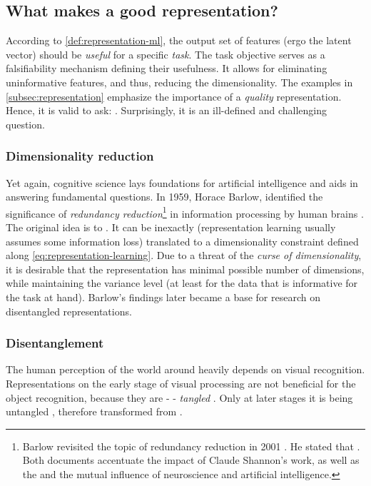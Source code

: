 \subsection{What makes a good representation?}
According to \autoref{def:representation-ml}, the output set of features (ergo the latent vector) should be \textit{useful} for a specific \textit{task}. The task objective serves as a falsifiability mechanism defining their usefulness. It allows for eliminating uninformative features, and thus, reducing the dimensionality. The examples in \autoref{subsec:representation} emphasize the importance of a \textit{quality} representation. Hence, it is valid to ask: . Surprisingly, it is an ill-defined and challenging question.


\subsubsection{Dimensionality reduction}
Yet again, cognitive science lays foundations for artificial intelligence and aids in answering fundamental questions. In 1959, Horace Barlow, identified the significance of \textit{redundancy reduction}\footnote{Barlow revisited the topic of redundancy reduction in 2001 \cite{Barlow2001}. He stated that . Both documents accentuate the impact of Claude Shannon's work, as well as the  and the mutual influence of neuroscience and artificial intelligence.} in information processing by human brains \cite{Barlow1959}. The original idea is to . It can be inexactly (representation learning usually assumes some information loss) translated to a dimensionality constraint defined along \autoref{eq:representation-learning}. Due to a threat of the \textit{curse of dimensionality}, it is desirable that the representation has minimal possible number of dimensions, while maintaining the variance level (at least for the data that is informative for the task at hand). Barlow's findings later became a base for research on disentangled representations. 


\subsubsection{Disentanglement}
The human perception of the world around heavily depends on visual recognition. Representations on the early stage of visual processing are not beneficial for the object recognition, because they are -  - \textit{tangled} \cite{DiCarlo2007}. Only at later stages it is being untangled \cite{DiCarlo2012}, therefore transformed from .

